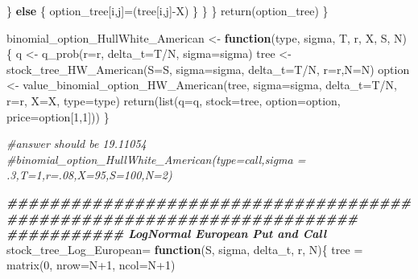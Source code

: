 \documentclass[
]{article}
\newenvironment{Shaded}{\begin{snugshade}}{\end{snugshade}}
\newcommand{\AttributeTok}[1]{\textcolor[rgb]{0.77,0.63,0.00}{#1}}
\newcommand{\CommentTok}[1]{\textcolor[rgb]{0.56,0.35,0.01}{\textit{#1}}}
\newcommand{\ControlFlowTok}[1]{\textcolor[rgb]{0.13,0.29,0.53}{\textbf{#1}}}
\newcommand{\DecValTok}[1]{\textcolor[rgb]{0.00,0.00,0.81}{#1}}
\newcommand{\DocumentationTok}[1]{\textcolor[rgb]{0.56,0.35,0.01}{\textbf{\textit{#1}}}}
\newcommand{\FunctionTok}[1]{\textcolor[rgb]{0.00,0.00,0.00}{#1}}
\newcommand{\NormalTok}[1]{#1}
\newcommand{\OtherTok}[1]{\textcolor[rgb]{0.56,0.35,0.01}{#1}}
\newcommand{\SpecialCharTok}[1]{\textcolor[rgb]{0.00,0.00,0.00}{#1}}
\begin{document}
\begin{Shaded}
\begin{Highlighting}[]
\NormalTok{      \} }
      \ControlFlowTok{else}\NormalTok{ \{}
\NormalTok{        option\_tree[i,j]}\OtherTok{=}\NormalTok{(tree[i,j]}\SpecialCharTok{{-}}\NormalTok{X)}
\NormalTok{      \}}
\NormalTok{    \}}
\NormalTok{  \}}
  \FunctionTok{return}\NormalTok{(option\_tree)}
\NormalTok{\}}

\NormalTok{binomial\_option\_HullWhite\_American }\OtherTok{\textless{}{-}} \ControlFlowTok{function}\NormalTok{(type, sigma, T, r, X, S, N) \{}
\NormalTok{  q }\OtherTok{\textless{}{-}} \FunctionTok{q\_prob}\NormalTok{(}\AttributeTok{r=}\NormalTok{r, }\AttributeTok{delta\_t=}\NormalTok{T}\SpecialCharTok{/}\NormalTok{N, }\AttributeTok{sigma=}\NormalTok{sigma)}
\NormalTok{  tree }\OtherTok{\textless{}{-}} \FunctionTok{stock\_tree\_HW\_American}\NormalTok{(}\AttributeTok{S=}\NormalTok{S, }\AttributeTok{sigma=}\NormalTok{sigma, }\AttributeTok{delta\_t=}\NormalTok{T}\SpecialCharTok{/}\NormalTok{N, }\AttributeTok{r=}\NormalTok{r,}\AttributeTok{N=}\NormalTok{N)}
\NormalTok{  option }\OtherTok{\textless{}{-}} \FunctionTok{value\_binomial\_option\_HW\_American}\NormalTok{(tree, }\AttributeTok{sigma=}\NormalTok{sigma, }\AttributeTok{delta\_t=}\NormalTok{T}\SpecialCharTok{/}\NormalTok{N, }\AttributeTok{r=}\NormalTok{r, }\AttributeTok{X=}\NormalTok{X, }\AttributeTok{type=}\NormalTok{type)}
  \FunctionTok{return}\NormalTok{(}\FunctionTok{list}\NormalTok{(}\AttributeTok{q=}\NormalTok{q, }\AttributeTok{stock=}\NormalTok{tree, }\AttributeTok{option=}\NormalTok{option, }\AttributeTok{price=}\NormalTok{option[}\DecValTok{1}\NormalTok{,}\DecValTok{1}\NormalTok{]))}
\NormalTok{\}}

\CommentTok{\#answer should be 19.11054}
\CommentTok{\#binomial\_option\_HullWhite\_American(type=\textquotesingle{}call\textquotesingle{},sigma = .3,T=1,r=.08,X=95,S=100,N=2) }

\DocumentationTok{\#\#\#\#\#\#\#\#\#\#\#\#\#\#\#\#\#\#\#\#\#\#\#\#\#\#\#\#\#\#\#\#\#\#\#\#\#\#\#\#\#\#\#\#\#\#\#\#\#\#\#\#\#\#\#\#\#\#\#\#\#\#\#\#\#\#\#\#\#\#\#}
\DocumentationTok{\#\#\#\#\#\#\#\#\#\#\# LogNormal European Put and Call}
\NormalTok{stock\_tree\_Log\_European}\OtherTok{=} \ControlFlowTok{function}\NormalTok{(S, sigma, delta\_t, r, N)\{}
\NormalTok{  tree }\OtherTok{=} \FunctionTok{matrix}\NormalTok{(}\DecValTok{0}\NormalTok{, }\AttributeTok{nrow=}\NormalTok{N}\SpecialCharTok{+}\DecValTok{1}\NormalTok{, }\AttributeTok{ncol=}\NormalTok{N}\SpecialCharTok{+}\DecValTok{1}\NormalTok{)}
  

\end{Highlighting}
\end{Shaded}
\end{document}
